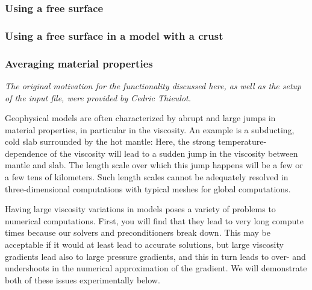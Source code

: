 \documentclass{article}
\begin{document}








\subsubsection{Using a free surface}
\label{sec:cookbooks-freesurface}



\subsubsection{Using a free surface in a model with a crust}
\label{sec:cookbooks-freesurfaceWC}



\subsubsection{Averaging material properties}
\label{sec:sinker-with-averaging}

\textit{The original motivation for the functionality discussed here, as well
  as the setup of the input file, were provided by Cedric Thieulot.}

Geophysical models are often characterized by abrupt and large jumps in material
properties, in particular in the viscosity. An example is a subducting, cold
slab surrounded by the hot mantle: Here, the strong
temperature-dependence of the viscosity will lead to a sudden jump in the
viscosity between mantle and slab. The length scale over which this jump happens
will be a few or a few tens of kilometers. Such length scales cannot be
adequately resolved in three-dimensional computations with typical meshes for
global computations.

Having large viscosity variations in models poses a variety of problems to
numerical computations. First, you will find that they lead to very long compute
times because our solvers and preconditioners break down. This may be
acceptable if it would at least lead to accurate solutions, but large viscosity
gradients lead also to large pressure gradients, and this in turn leads to over-
and undershoots in the numerical approximation of the gradient. We will
demonstrate both of these issues experimentally below.
\end{document}
